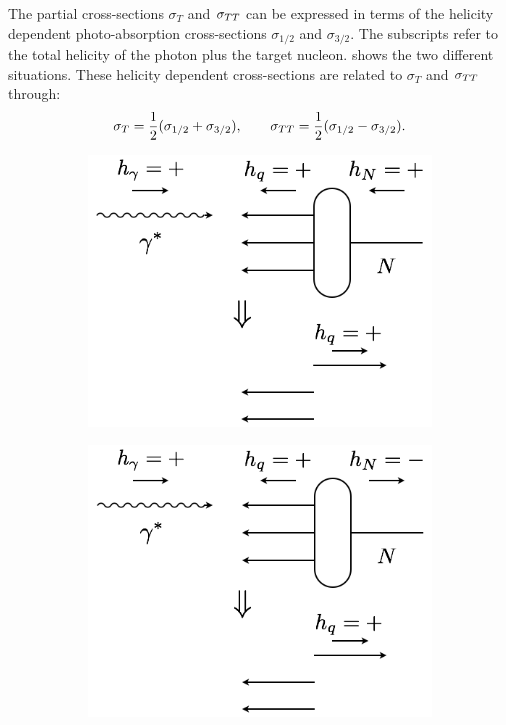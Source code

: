 The partial cross-sections $\sigma_T$ and $\sigma_{TT}$ can be expressed in terms of the helicity dependent photo-absorption cross-sections $\sigma_{1/2}$ and $\sigma_{3/2}$. The subscripts refer to the total helicity of the photon plus the target nucleon.  shows the two different situations. These helicity dependent cross-sections are related to $\sigma_T$ and $\sigma_{TT}$ through:
\begin{equation} \label{C2S4E5}
\sigma_T = \frac{1}{2}(\sigma_{1/2}+\sigma_{3/2}), \qquad \sigma_{TT} = \frac{1}{2}(\sigma_{1/2}-\sigma_{3/2}).
\end{equation}

\begin{figure}[tb!]
  \centering
  \begin{subfigure}[t]{0.4\textwidth}
    \includegraphics[width=\textwidth]{figs/photon-absorption-a.png}
    \subcaption{{}\label{C2S4F1A}}
  \end{subfigure}
  \qquad
  \qquad
  \begin{subfigure}[t]{0.4\textwidth}
    \includegraphics[width=\textwidth]{figs/photon-absorption-b.png}

\end{subfigure}
\end{figure}
